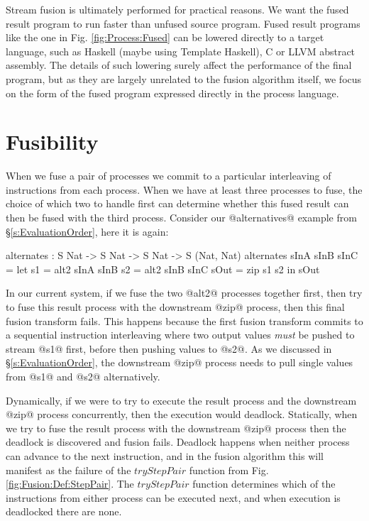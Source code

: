 Stream fusion is ultimately performed for practical reasons. We want the fused result program to run faster than unfused source program. Fused result programs like the one in Fig. \ref{fig:Process:Fused} can be lowered directly to a target language, such as Haskell (maybe using Template Haskell), C or LLVM abstract assembly. The details of such lowering surely affect the performance of the final program, but as they are largely unrelated to the fusion algorithm itself, we focus on the form of the fused program expressed directly in the process language.


\section{Fusibility}
\label{s:FusionOrder}
When we fuse a pair of processes we commit to a particular interleaving of instructions from each process. When we have at least three processes to fuse, the choice of which two to handle first can determine whether this fused result can then be fused with the third process. Consider our @alternatives@ example from \S\ref{s:EvaluationOrder}, here it is again:
\begin{code}
  alternates : S Nat -> S Nat -> S Nat -> S (Nat, Nat)
  alternates sInA sInB sInC
   = let  s1   = alt2 sInA sInB
          s2   = alt2 sInB sInC
          sOut = zip s1 s2
     in   sOut
\end{code}

In our current system, if we fuse the two @alt2@ processes together first, then try to fuse this result process with the downstream @zip@ process, then this final fusion transform fails. This happens because the first fusion transform commits to a sequential instruction interleaving where two output values \emph{must} be pushed to stream @s1@ first, before then pushing values to @s2@. As we discussed in \S\ref{s:EvaluationOrder}, the downstream @zip@ process needs to pull single values from @s1@ and @s2@ alternatively.

Dynamically, if we were to try to execute the result process and the downstream @zip@ process concurrently, then the execution would deadlock. Statically, when we try to fuse the result process with the downstream @zip@ process then the deadlock is discovered and fusion fails. Deadlock happens when neither process can advance to the next instruction, and in the fusion algorithm this will manifest as the failure of the $tryStepPair$ function from Fig.\ref{fig:Fusion:Def:StepPair}. The $tryStepPair$ function determines which of the instructions from either process can be executed next, and when execution is deadlocked there are none.

